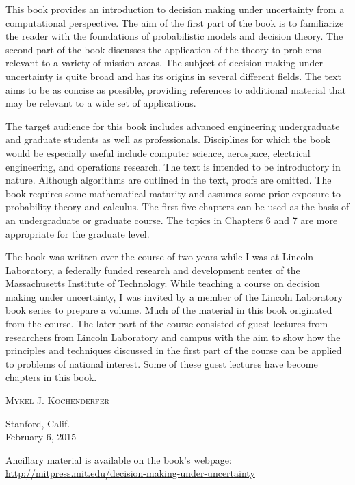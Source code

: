 \documentclass[dvipdfmx,uplatex,useotf]{dmubookJ}
\begin{document}
\begin{preface}
This book provides an introduction to decision making under uncertainty from a computational perspective. The aim of the first part of the book is to familiarize the reader with the foundations of probabilistic models and decision theory. The second part of the book discusses the application of the theory to problems relevant to a variety of mission areas. The subject of decision making under uncertainty is quite broad and has its origins in several different fields. The text aims to be as concise as possible, providing references to additional material that may be relevant to a wide set of applications.

The target audience for this book includes advanced engineering undergraduate and graduate students as well as professionals. Disciplines for which the book would be especially useful include computer science, aerospace, electrical engineering, and operations research. The text is intended to be introductory in nature. Although algorithms are outlined in the text, proofs are omitted. The book requires some mathematical maturity and assumes some prior exposure to probability theory and calculus. The first five chapters can be used as the basis of an undergraduate or graduate course. The topics in Chapters 6 and 7 are more appropriate for the graduate level.

The book was written over the course of two years while I was at Lincoln Laboratory, a federally funded research and development center of the Massachusetts Institute of Technology. While teaching a course on decision making under uncertainty, I was invited by a member of the Lincoln Laboratory book series to prepare a volume. Much of the material in this book originated from the course. The later part of the course consisted of guest lectures from researchers from Lincoln Laboratory and campus with the aim to show how the principles and techniques discussed in the first part of the course can be applied to problems of national interest. Some of these guest lectures have become chapters in this book.

\vspace{1cm}

\noindent \textsc{Mykel J. Kochenderfer}

\noindent Stanford, Calif.\\
February 6, 2015

\vfill

\noindent \normalfont Ancillary material is available on the book's webpage:\\ \url{http://mitpress.mit.edu/decision-making-under-uncertainty}

\end{preface}
\end{document}
